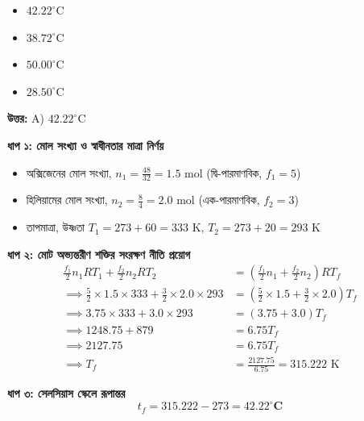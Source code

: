 \documentclass[12pt, a4paper]{article}
\begin{document}
\begin{itemize}[label={}, leftmargin=1cm, itemsep=0.5em]
    \item[\textbf{A)}] $42.22^\circ\text{C}$
    \item[\textbf{B)}] $38.72^\circ\text{C}$
    \item[\textbf{C)}] $50.00^\circ\text{C}$
    \item[\textbf{D)}] $28.50^\circ\text{C}$
\end{itemize}

\vspace{0.5em}
\begin{tcolorbox}[answerbox]
    \textbf{\color{success} উত্তর:} A) $42.22^\circ\text{C}$
\end{tcolorbox}
\vspace{1em}

\begin{tcolorbox}[solutionbox={সমাধান (Solution)}]
    \noindent
    \textbf{ধাপ ১: মোল সংখ্যা ও স্বাধীনতার মাত্রা নির্ণয়}
    \begin{itemize}[leftmargin=1.5em, itemsep=0.2em]
        \item অক্সিজেনের মোল সংখ্যা, $n_1 = \frac{48}{32} = 1.5\text{ mol}$ (দ্বি-পারমাণবিক, $f_1 = 5$)
        \item হিলিয়ামের মোল সংখ্যা, $n_2 = \frac{8}{4} = 2.0\text{ mol}$ (এক-পারমাণবিক, $f_2 = 3$)
        \item তাপমাত্রা, উষ্ণতা $T_1 = 273 + 60 = 333\text{ K}$, $T_2 = 273 + 20 = 293\text{ K}$
    \end{itemize}
    
    \vspace{0.4em}
    \noindent\textbf{ধাপ ২: মোট অভ্যন্তরীণ শক্তির সংরক্ষণ নীতি প্রয়োগ}
    \begin{align*}
        \frac{f_1}{2} n_1 R T_1 + \frac{f_2}{2} n_2 R T_2 &= \left(\frac{f_1}{2} n_1 + \frac{f_2}{2} n_2\right) R T_f \\
        \implies \frac{5}{2} \times 1.5 \times 333 + \frac{3}{2} \times 2.0 \times 293 &= \left(\frac{5}{2} \times 1.5 + \frac{3}{2} \times 2.0\right) T_f \\
        \implies 3.75 \times 333 + 3.0 \times 293 &= (3.75 + 3.0) T_f \\
        \implies 1248.75 + 879 &= 6.75 T_f \\
        \implies 2127.75 &= 6.75 T_f \\
        \implies T_f &= \frac{2127.75}{6.75} = 315.222\text{ K}
    \end{align*}
    
    \vspace{0.4em}
    \noindent\textbf{ধাপ ৩: সেলসিয়াস স্কেলে রূপান্তর}
    \[ t_f = 315.222 - 273 = \mathbf{42.22^\circ\text{C}} \]
\end{tcolorbox}
\end{document}
